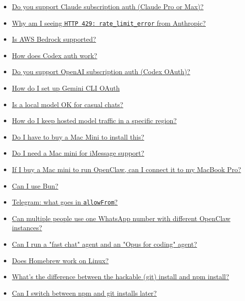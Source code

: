\begin{itemize}
  \item \href{\#do-you-support-claude-subscription-auth-claude-pro-or-max}{Do you support Claude subscription auth (Claude Pro or Max)?}
  \item \href{\#why-am-i-seeing-http-429-ratelimiterror-from-anthropic}{Why am I seeing \texttt{HTTP 429: rate\_limit\_error} from Anthropic?}
  \item \href{\#is-aws-bedrock-supported}{Is AWS Bedrock supported?}
  \item \href{\#how-does-codex-auth-work}{How does Codex auth work?}
  \item \href{\#do-you-support-openai-subscription-auth-codex-oauth}{Do you support OpenAI subscription auth (Codex OAuth)?}
  \item \href{\#how-do-i-set-up-gemini-cli-oauth}{How do I set up Gemini CLI OAuth}
  \item \href{\#is-a-local-model-ok-for-casual-chats}{Is a local model OK for casual chats?}
  \item \href{\#how-do-i-keep-hosted-model-traffic-in-a-specific-region}{How do I keep hosted model traffic in a specific region?}
  \item \href{\#do-i-have-to-buy-a-mac-mini-to-install-this}{Do I have to buy a Mac Mini to install this?}
  \item \href{\#do-i-need-a-mac-mini-for-imessage-support}{Do I need a Mac mini for iMessage support?}
  \item \href{\#if-i-buy-a-mac-mini-to-run-openclaw-can-i-connect-it-to-my-macbook-pro}{If I buy a Mac mini to run OpenClaw, can I connect it to my MacBook Pro?}
  \item \href{\#can-i-use-bun}{Can I use Bun?}
  \item \href{\#telegram-what-goes-in-allowfrom}{Telegram: what goes in \texttt{allowFrom}?}
  \item \href{\#can-multiple-people-use-one-whatsapp-number-with-different-openclaw-instances}{Can multiple people use one WhatsApp number with different OpenClaw instances?}
  \item \href{\#can-i-run-a-fast-chat-agent-and-an-opus-for-coding-agent}{Can I run a "fast chat" agent and an "Opus for coding" agent?}
  \item \href{\#does-homebrew-work-on-linux}{Does Homebrew work on Linux?}
  \item \href{\#whats-the-difference-between-the-hackable-git-install-and-npm-install}{What's the difference between the hackable (git) install and npm install?}
  \item \href{\#can-i-switch-between-npm-and-git-installs-later}{Can I switch between npm and git installs later?}

\end{itemize}
